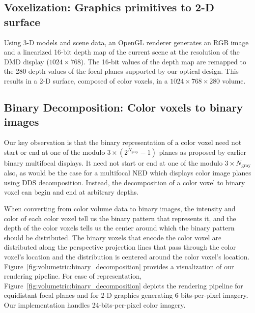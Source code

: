
\subsection{Voxelization: Graphics primitives to 2-D surface}
\label{sec:volumetric:Voxelization}
Using 3-D models and scene data, an OpenGL renderer generates an RGB image and a linearized 16-bit depth map of the current scene at the resolution of the DMD display ($1024 \times 768$). The 16-bit values of the depth map are remapped to the 280 depth values of the focal planes supported by our optical design. This results in a 2-D surface, composed of color voxels, in a $1024 \times 768 \times 280$ volume.

\subsection{Binary Decomposition: Color voxels to binary images}
\label{sec:volumetric:fixed_pipeline}

Our key observation is that the binary representation of a color voxel need not start or end at one of the modulo $3 \times (2^{N_{\text{gray}}} - 1)$ planes as proposed by earlier binary multifocal displays. It need not start or end at one of the modulo $3 \times N_{\text{gray}}$ also, as would be the case for a multifocal NED which displays color image planes using DDS decomposition. Instead, the decomposition of a color voxel to binary voxel can begin and end at arbitrary depths. 

When converting from color volume data to binary images, the intensity and color of each color voxel tell us the binary pattern that represents it, and the depth of the color voxels tells us the center around which the binary pattern should be distributed. The binary voxels that encode the color voxel are distributed along the perspective projection lines that pass through the color voxel's location and the distribution is centered around the color voxel's location. Figure~\ref{fig:volumetric:binary_decomposition} provides a visualization of our rendering pipeline. For ease of representation, Figure~\ref{fig:volumetric:binary_decomposition} depicts the rendering pipeline for equidistant focal planes and for 2-D graphics generating 6 bits-per-pixel imagery. Our implementation handles 24-bits-per-pixel color imagery.


